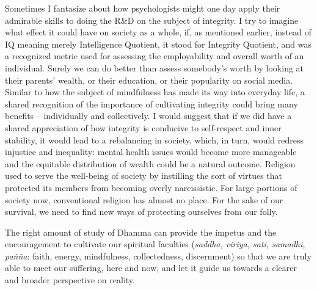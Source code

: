 Sometimes I fantasize about how psychologists might one day apply their
admirable skills to doing the R\&D on the subject of integrity. I try to
imagine what effect it could have on society as a whole, if, as
mentioned earlier, instead of IQ meaning merely Intelligence Quotient,
it stood for Integrity Quotient, and was a recognized metric used for
assessing the employability and overall worth of an individual. Surely
we can do better than assess somebody's worth by looking at their
parents' wealth, or their education, or their popularity on social
media. Similar to how the subject of mindfulness has made its way into
everyday life, a shared recognition of the importance of cultivating
integrity could bring many benefits -- individually and collectively. I
would suggest that if we did have a shared appreciation of how integrity
is conducive to self-respect and inner stability, it would lead to a
rebalancing in society, which, in turn, would redress injustice and
inequality: mental health issues would become more manageable and the
equitable distribution of wealth could be a natural outcome. Religion
used to serve the well-being of society by instilling the sort of
virtues that protected its members from becoming overly narcissistic.
For large portions of society now, conventional religion has almost no
place. For the sake of our survival, we need to find new ways of
protecting ourselves from our folly.

The right amount of study of Dhamma can provide the impetus and the
encouragement to cultivate our spiritual faculties (\emph{saddha,
viriya, sati, samadhi, pañña}: faith, energy, mindfulness,
collectedness, discernment) so that we are truly able to meet our
suffering, here and now, and let it guide us towards a clearer and
broader perspective on reality.
